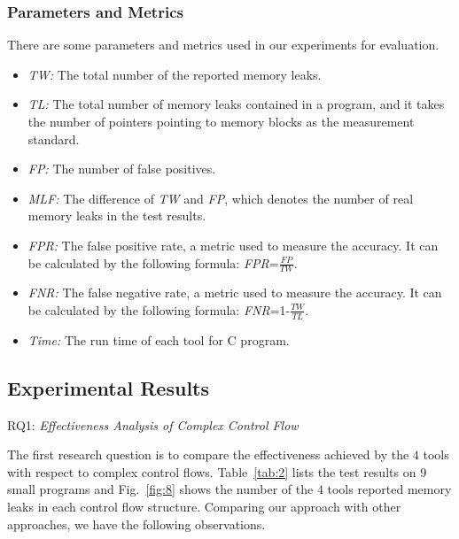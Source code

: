 \subsubsection{Parameters and Metrics}\label{ssec:pm}
There are some parameters and metrics used in our experiments for evaluation.
\begin{itemize}
\item \textit{TW:} The total number of the reported memory leaks.
\item \textit{TL:} The total number of memory leaks contained in a program, and it takes the number of pointers pointing to memory blocks as the measurement standard.
\item \textit{FP:} The number of false positives.
\item \textit{MLF:} The difference of \textit{TW} and \textit{FP}, which denotes the number of real memory leaks in the test results.
\item \textit{FPR:} The false positive rate, a metric used to measure the accuracy. It can be calculated by the following formula: \textit{FPR}=$\frac{\textit{FP}}{\textit{TW}}$.
\item \textit{FNR:} The false negative rate, a metric used to measure the accuracy. It can be calculated by the following formula: \textit{FNR}=1-$\frac{\textit{TW}}{\textit{TL}}$.
\item \textit{Time:} The run time of each tool for C program.
\end{itemize}

\subsection{Experimental Results}

\noindent RQ1: \textit{Effectiveness Analysis of Complex Control Flow}

The first research question is to compare the effectiveness achieved by the $4$ tools with respect to complex control flows. Table~\ref{tab:2} lists the test results on $9$ small programs and Fig.~\ref{fig:8} shows the number of the $4$ tools reported memory leaks in each control flow structure. Comparing our approach with other approaches, we have the following observations.

